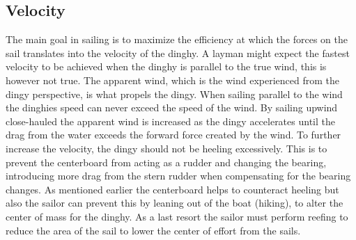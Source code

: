 \subsection{Velocity}
The main goal in sailing is to maximize the efficiency at which the forces on the sail translates into the velocity of the dinghy. A layman might expect the fastest velocity to be achieved when the dinghy is parallel to the true wind, this is however not true. The apparent wind, which is the wind experienced from the dingy perspective, is what propels the dingy. When sailing parallel to the wind the dinghies speed can never exceed the speed of the wind\cite{sail-force}. By sailing upwind close-hauled the apparent wind is increased as the dingy accelerates until the drag from the water exceeds the forward force created by the wind. To further increase the velocity, the dingy should not be heeling excessively. This is to prevent the centerboard from acting as a rudder and changing the bearing, introducing more drag from the stern rudder when compensating for the bearing changes. As mentioned earlier the centerboard helps to counteract heeling but also the sailor can prevent this by leaning out of the boat (hiking), to alter the center of mass for the dinghy. As a last resort the sailor must perform reefing to reduce the area of the sail to lower the center of effort from the sails.
